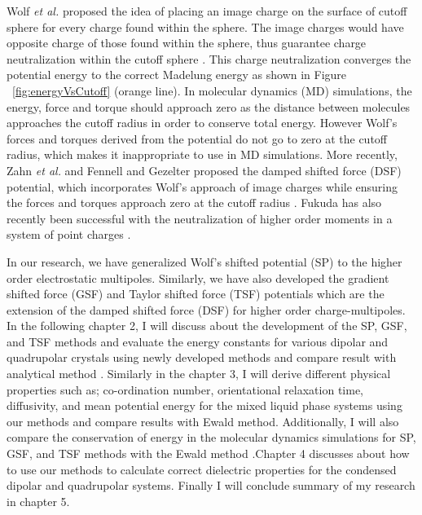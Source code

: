 Wolf \textit{ et al.} proposed the idea of placing an image charge on the surface of cutoff sphere for every charge found within the sphere. The image charges would have opposite charge of those found within the sphere, thus guarantee charge neutralization  within the cutoff sphere  \cite{Wolf99}. This charge neutralization converges the potential energy to the correct Madelung energy as shown in Figure ~\ref{fig:energyVsCutoff} (orange line). In molecular dynamics (MD) simulations, the energy, force and torque should approach zero as the distance between molecules approaches the cutoff radius  in order to conserve total energy. However Wolf's forces and torques derived from the potential do not go to zero at the cutoff radius, which makes it inappropriate to use in MD simulations. More recently, Zahn \textit{et al.} and Fennell and Gezelter proposed the damped shifted force (DSF) potential, which incorporates Wolf's approach of image charges while ensuring the forces and torques approach zero at the cutoff radius \cite{Zahn02, Gezelter06}. Fukuda has also recently been successful with the neutralization of higher order moments in a system of point charges \cite{Fukuda13}.

In our research, we have generalized Wolf's shifted potential (SP) to the higher order electrostatic multipoles. Similarly, we have also developed the gradient shifted force (GSF) and Taylor shifted force (TSF) potentials which are the extension of the damped shifted force (DSF) for higher order charge-multipoles. In the following chapter 2, I will discuss about the development of the SP, GSF, and TSF methods and evaluate the energy constants for various dipolar and quadrupolar crystals using newly developed methods and compare result with analytical method \cite{Lamichhane14_I}. Similarly in the chapter 3,  I will derive different physical properties such as; co-ordination number, orientational relaxation time, diffusivity, and  mean potential energy for the mixed liquid phase systems using our methods and compare results with Ewald method. Additionally, I will also compare the conservation of energy in the molecular dynamics simulations for SP, GSF, and TSF methods with the Ewald method \cite{Lamichhane14_II}.Chapter 4 discusses about how to use our methods to calculate correct dielectric properties for the condensed dipolar and quadrupolar systems. Finally I will conclude summary of my research in chapter 5. 